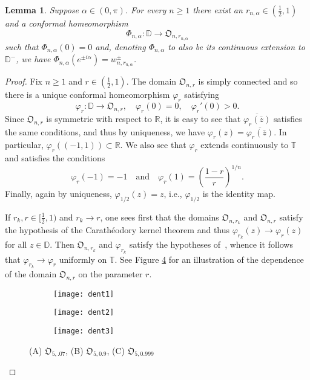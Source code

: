 \documentclass[11pt,reqno]{amsart}
\numberwithin{equation}{section}
\theoremstyle{plain}
\newtheorem{Lemma}[equation]{Lemma}
\theoremstyle{definition}
\begin{document}
\begin{Lemma}\label{le:conformal general n} Suppose $\alpha \in (0, \pi)$. For every $n \geq 1$
there exist an $r_{n,\alpha} \in (\frac{1}{2}, 1)$ and a conformal homeomorphism $$\Phi_{n,\alpha}:{\mathbb{D}}\to{\mathfrak{O}}_{n, r_{n,\alpha}}$$
 such that $\Phi_{n,\alpha}(0)=0$ and, denoting $\Phi_{n,\alpha}$ to also be its continuous extension to ${ \mathbb{D}}^{-}$,  we have $\Phi_{n,\alpha}(e^{\pm i\alpha})=w^\pm_{n,r_{n, \alpha}}$.
\end{Lemma}

\begin{proof}
Fix $n \geq 1$ and $r \in (\frac{1}{2}, 1)$. The domain ${{\mathfrak{O}}_{n,r}}$ is simply connected and so there is a unique conformal homeomorphism ${\varphi}_r$ satisfying
$${\varphi}_r:{\mathbb{D}}\to{{\mathfrak{O}}_{n,r}}, \quad {\varphi}_r(0)=0, \quad {\varphi}_r'(0)>0.$$ Since ${{\mathfrak{O}}_{n,r}}$ is symmetric with respect to ${ \mathbb{R}}$, it is easy to see that $\overline{{\varphi}_r(\bar z)}$ satisfies the same conditions, and thus by uniqueness, we have ${\varphi}_r(z)=\overline{{\varphi}_r(\bar z)}$. In particular, ${\varphi}_r((-1, 1))\subset {\mathbb{R}}$. We also see that ${\varphi}_r$ extends continuously to ${\mathbb{T}}$ and satisfies the conditions
$${\varphi}_r(-1)=-1 \quad \mbox{and} \quad {\varphi}_r(1)=\left(\frac{1-r}{r}\right)^{1/n}.$$ Finally, again by uniqueness, ${\varphi}_{1/2}(z) = z$, i.e., ${\varphi}_{1/2}$ is the identity map.

If $r_k, r\in [\frac{1}{2}, 1)$ and $r_k\to r$, one sees first that the domains ${\mathfrak{O}}_{n,r_k}$ and ${{\mathfrak{O}}_{n,r}}$ satisfy the hypothesis of the Carath\'{e}odory kernel theorem \cite[Theorem 1.8]{Po} and thus ${\varphi}_{r_k}(z)\to{\varphi}_r(z)$ for all $z\in {\mathbb{D}}$. Then  ${\mathfrak{O}}_{n,r_k}$ and ${\varphi}_{r_k}$ satisfy the hypotheses of~\cite[Corollary 2.4]{Po}, whence it follows that ${\varphi}_{r_k}\to{\varphi}_r$ uniformly on ${\mathbb{T}}$. See Figure \ref{FigureX3} for an illustration of the dependence of the domain ${\mathfrak{O}}_{n, r}$ on the parameter $r$. 

\begin{figure}
\centering
\begin{subfigure}{.335\textwidth}
  \centering
  \texttt{[image: dent1]}
  \caption{}
  \label{}
\end{subfigure}\begin{subfigure}{.335\textwidth}
  \centering
  \texttt{[image: dent2]}
  \caption{}
  \label{}
\end{subfigure}\begin{subfigure}{.335\textwidth}
  \centering
  \texttt{[image: dent3]}
  \caption{}
  \label{}
\end{subfigure}
\caption{{\footnotesize (A) ${\mathfrak{O}}_{5, .07}$, (B) ${\mathfrak{O}}_{5, 0.9}$, (C) ${\mathfrak{O}}_{5, 0.999}$}}
\label{FigureX3}
\end{figure}


\end{proof}
\end{document}
